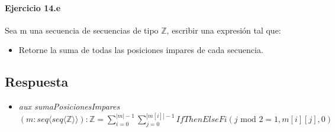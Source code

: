 \documentclass[a4paper]{article}
\begin{document}
\paragraph{Ejercicio 14.e} Sea m una secuencia de secuencias de tipo $\mathbb{Z}$, escribir una expresión tal que:

\begin{itemize}
	\item Retorne la suma de todas las posiciones impares de cada secuencia.
\end{itemize}

\subsection*{Respuesta}

\begin{itemize}
\item \textit{aux sumaPosicionesImpares}$(m: seq\langle seq\langle \mathbb{Z}\rangle \rangle):\mathbb{Z}
	=\sum_{i=0}^{|m|-1}\sum_{j=0}^{|m[i]|-1} IfThenElseFi(j\textrm{ mod }2=1,m[i][j],0)$
\end{itemize}
\end{document}
